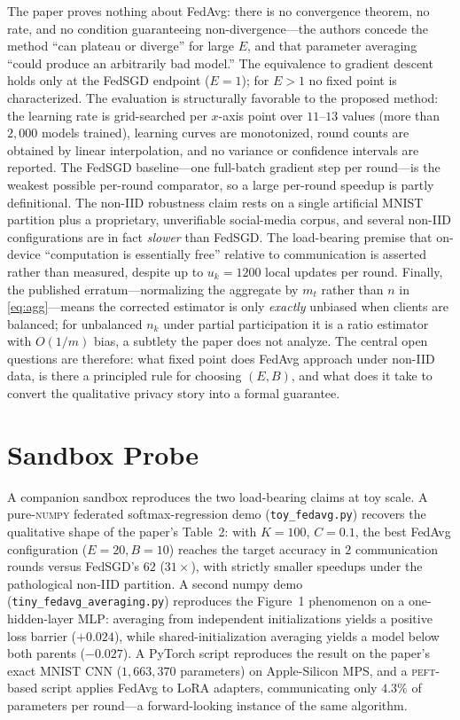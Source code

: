 \documentclass[11pt]{article}
\begin{document}
The paper proves nothing about FedAvg: there is no convergence theorem, no rate, and no condition guaranteeing non-divergence---the authors concede the method ``can plateau or diverge'' for large $E$, and that parameter averaging ``could produce an arbitrarily bad model.'' The equivalence to gradient descent holds only at the FedSGD endpoint ($E=1$); for $E>1$ no fixed point is characterized. The evaluation is structurally favorable to the proposed method: the learning rate is grid-searched per $x$-axis point over $11$--$13$ values (more than $2{,}000$ models trained), learning curves are monotonized, round counts are obtained by linear interpolation, and no variance or confidence intervals are reported. The FedSGD baseline---one full-batch gradient step per round---is the weakest possible per-round comparator, so a large per-round speedup is partly definitional. The non-IID robustness claim rests on a single artificial MNIST partition plus a proprietary, unverifiable social-media corpus, and several non-IID configurations are in fact \emph{slower} than FedSGD. The load-bearing premise that on-device ``computation is essentially free'' relative to communication is asserted rather than measured, despite up to $u_k=1200$ local updates per round. Finally, the published erratum---normalizing the aggregate by $m_t$ rather than $n$ in \eqref{eq:agg}---means the corrected estimator is only \emph{exactly} unbiased when clients are balanced; for unbalanced $n_k$ under partial participation it is a ratio estimator with $O(1/m)$ bias, a subtlety the paper does not analyze. The central open questions are therefore: what fixed point does FedAvg approach under non-IID data, is there a principled rule for choosing $(E,B)$, and what does it take to convert the qualitative privacy story into a formal guarantee.

\section*{Sandbox Probe}

A companion sandbox reproduces the two load-bearing claims at toy scale. A pure-\textsc{numpy} federated softmax-regression demo (\texttt{toy\_fedavg.py}) recovers the qualitative shape of the paper's Table~2: with $K=100$, $C=0.1$, the best FedAvg configuration ($E=20,B=10$) reaches the target accuracy in $2$ communication rounds versus FedSGD's $62$ ($31\times$), with strictly smaller speedups under the pathological non-IID partition. A second numpy demo (\texttt{tiny\_fedavg\_averaging.py}) reproduces the Figure~1 phenomenon on a one-hidden-layer MLP: averaging from independent initializations yields a positive loss barrier ($+0.024$), while shared-initialization averaging yields a model below both parents ($-0.027$). A PyTorch script reproduces the result on the paper's exact MNIST CNN ($1{,}663{,}370$ parameters) on Apple-Silicon MPS, and a \textsc{peft}-based script applies FedAvg to LoRA adapters, communicating only $4.3\%$ of parameters per round---a forward-looking instance of the same algorithm.



\end{document}
